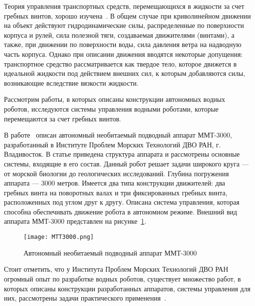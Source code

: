 Теория управления транспортных средств, перемещающихся в жидкости за счет гребных винтов, хорошо изучена~\cite{Ageev, Fossen, Fossen2, Basin_Anfimov_1961, Lebedev_Pershits_1969}. В общем случае при криволинейном движении на объект действуют гидродинамические силы, распределенные по поверхности корпуса и рулей, сила полезной тяги, создаваемая движителями (винтами), а также, при движении по поверхности воды, сила давления ветра на надводную часть корпуса. Однако при описании движения вводятся некоторые допущения: транспортное средство рассматривается как твердое тело, которое движется в идеальной жидкости под действием внешних сил, к которым добавляются силы, возникающие вследствие вязкости жидкости.

Рассмотрим работы, в которых описаны конструкции автономных водных роботов, исследуются системы управления водными роботами, которые перемещаются за счет гребных винтов.

В работе~\cite{Gornak_MMT3000} описан автономный необитаемый подводный аппарат ММТ-3000, разработанный в Институте Проблем Морских Технологий ДВО РАН, г. Владивосток. В статье приведена структура аппарата и рассмотрены основные системы, входящие в его состав. Данный робот решает задачи широкого круга --- от морской биологии до геологических исследований. Глубина погружения аппарата --- 3000 метров. Имеется два типа конструкции движителей: два гребных винта на поворотных валах и три фиксированных гребных винта, расположенных под углом друг к другу. Описана система управления, которая способна обеспечивать движение робота в автономном режиме. Внешний вид аппарата ММТ-3000 представлен на рисунке~\ref{MTT3000}. 

\begin{figure}[h]
	\centering
	\texttt{[image: MTT3000.png]}%
	\caption{Автономный необитаемый подводный аппарат ММТ-3000}
	\label{MTT3000}
\end{figure}

Стоит отметить, что у Института Проблем Морских Технологий ДВО РАН огромный опыт по разработке водных роботов, существует множество работ, в которых описаны конструкции разработанных аппаратов, системы управления для них, рассмотрены задачи практического применения~\cite{Inzarcev_2018_book, Matvienko_2017, Naumov_2011, Boreyko_2011, Iznarcev_2007, Vaulin_2017, Inzarcev_2016}.

